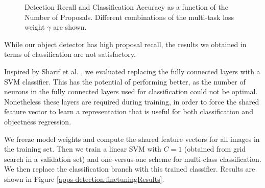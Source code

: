 \begin{figure}[!htb]
	\caption[Detection Recall and Classification Accuracy as a function of the Number of Proposals]{Detection Recall and Classification Accuracy as a function of the Number of Proposals. Different combinations of the multi-task loss weight $\gamma$ are shown.}
	\label{apps-detection:accuracyRecallVsNumberOfProposals}
\end{figure}

While our object detector has high proposal recall, the results we obtained in terms of classification are not satisfactory. \newpage 

Inspired by Sharif et al. \cite[5em]{sharif2014cnn}, we evaluated replacing the fully connected layers with a SVM classifier. This has the potential of performing better, as the number of neurons in the fully connected layers used for classification could not be optimal. Nonetheless these layers are required during training, in order to force the shared feature vector to learn a representation that is useful for both classification and objectness regression.

We freeze model weights and compute the shared feature vectors for all images in the training set. Then we train a linear SVM with $C = 1$ (obtained from grid search in a validation set) and one-versus-one scheme for multi-class classification. We then replace the classification branch with this trained classifier. Results are shown in Figure \ref{apps-detection:finetuningResults}.


